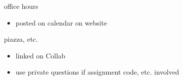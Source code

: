 \begin{frame}{office hours}
    \begin{itemize}
    \item posted on calendar on website
    \end{itemize}
\end{frame}

\begin{frame}{piazza, etc.}
    \begin{itemize}
    \item linked on Collab
    \vspace{.5cm}
    \item use private questions if assignment code, etc. involved
    \end{itemize}
\end{frame}

